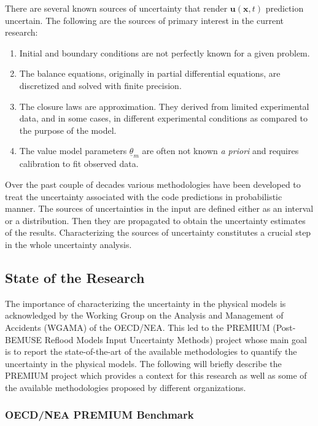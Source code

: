\documentclass[11pt,titlepage]{article}
\begin{document}
There are several known sources of uncertainty that render $\mathbf{u}(\mathbf{x}, t)$ prediction uncertain.
The following are the sources of primary interest in the current research:
\begin{enumerate}
	\item Initial and boundary conditions are not perfectly known for a given problem.
	\item The balance equations, originally in partial differential equations, are discretized and solved with finite precision.
	\item The closure laws are approximation. They derived from limited experimental data, and in some cases, in different experimental conditions as compared to the purpose of the model.
	\item The value model parameters $\underline{\theta}_m$ are often not known \emph{a priori} and requires calibration to fit observed data.
\end{enumerate}


Over the past couple of decades various methodologies have been developed to treat the uncertainty associated with the code predictions in probabilistic manner.
The sources of uncertainties in the input are defined either as an interval or a distribution. 
Then they are propagated to obtain the uncertainty estimates of the results. 
Characterizing the sources of uncertainty constitutes a crucial step in the whole uncertainty analysis.

\subsection{State of the Research}

The importance of characterizing the uncertainty in the physical models is acknowledged by the Working Group on the Analysis and Management of Accidents (WGAMA) of the OECD/NEA. 
This led to the PREMIUM (Post-BEMUSE Reflood Models Input Uncertainty Methods) project whose main goal is to report the state-of-the-art of the available methodologies to quantify the uncertainty in the physical models. 
The following will briefly describe the PREMIUM project which provides a context for this research as well as some of the available methodologies proposed by different organizations.

\subsubsection{OECD/NEA PREMIUM Benchmark}
\end{document}
